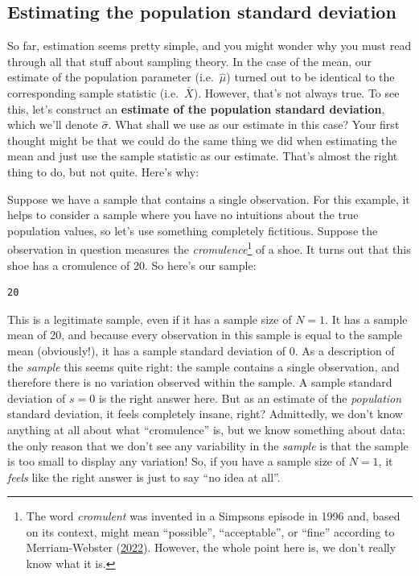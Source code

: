 \documentclass[
]{book}
\theoremstyle{definition}
\theoremstyle{definition}
\theoremstyle{definition}
\theoremstyle{definition}
\theoremstyle{remark}
\begin{document}
\hypertarget{estimating-the-population-standard-deviation}{%
\subsection{Estimating the population standard deviation}\label{estimating-the-population-standard-deviation}}

So far, estimation seems pretty simple, and you might wonder why you must read through all that stuff about sampling theory. In the case of the mean, our estimate of the population parameter (i.e.~\(\hat\mu\)) turned out to be identical to the corresponding sample statistic (i.e.~\(\bar{X}\)). However, that's not always true. To see this, let's construct an \textbf{estimate of the population standard deviation}, which we'll denote \(\hat\sigma\). What shall we use as our estimate in this case? Your first thought might be that we could do the same thing we did when estimating the mean and just use the sample statistic as our estimate. That's almost the right thing to do, but not quite. Here's why:

Suppose we have a sample that contains a single observation. For this example, it helps to consider a sample where you have no intuitions about the true population values, so let's use something completely fictitious. Suppose the observation in question measures the \emph{cromulence}\footnote{The word \emph{cromulent} was invented in a Simpsons episode in 1996 and, based on its context, might mean ``possible'', ``acceptable'', or ``fine'' according to Merriam-Webster (\protect\hyperlink{ref-Cromulence}{2022}). However, the whole point here is, we don't really know what it is.} of a shoe. It turns out that this shoe has a cromulence of 20. So here's our sample:

\begin{verbatim}
20
\end{verbatim}

This is a legitimate sample, even if it has a sample size of \(N=1\). It has a sample mean of 20, and because every observation in this sample is equal to the sample mean (obviously!), it has a sample standard deviation of 0. As a description of the \emph{sample} this seems quite right: the sample contains a single observation, and therefore there is no variation observed within the sample. A sample standard deviation of \(s = 0\) is the right answer here. But as an estimate of the \emph{population} standard deviation, it feels completely insane, right? Admittedly, we don't know anything at all about what ``cromulence'' is, but we know something about data: the only reason that we don't see any variability in the \emph{sample} is that the sample is too small to display any variation! So, if you have a sample size of \(N=1\), it \emph{feels} like the right answer is just to say ``no idea at all''.
\end{document}

